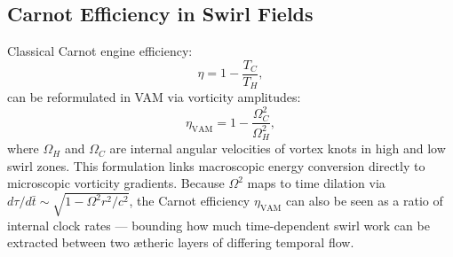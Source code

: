 \subsection*{Carnot Efficiency in Swirl Fields}

Classical Carnot engine efficiency:
\begin{equation}
    \eta = 1 - \frac{T_C}{T_H},
\end{equation}
can be reformulated in VAM via vorticity amplitudes:
\begin{equation}
    \eta_\text{VAM} = 1 - \frac{\Omega_C^2}{\Omega_H^2},
\end{equation}
where $\Omega_H$ and $\Omega_C$ are internal angular velocities of vortex knots in high and low swirl zones. This formulation links macroscopic energy conversion directly to microscopic vorticity gradients.
Because $\Omega^2$ maps to time dilation via $d\tau/d\bar{t} \sim \sqrt{1 - \Omega^2 r^2/c^2}$, the Carnot efficiency $\eta_\text{VAM}$ can also be seen as a ratio of internal clock rates — bounding how much time-dependent swirl work can be extracted between two ætheric layers of differing temporal flow.

